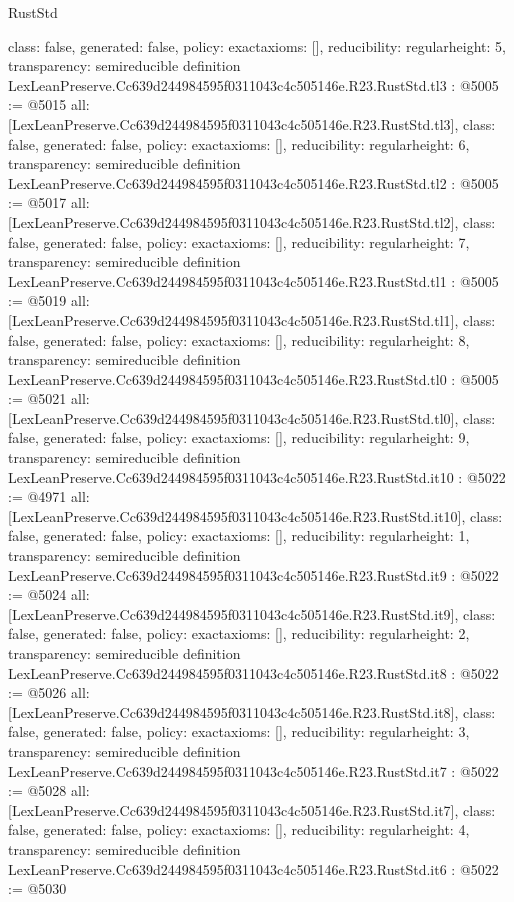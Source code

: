 \begin{lexlean}{RustStd}
\begin{coremodule}
{  class: false,
  generated: false,
  policy: exact{axioms: []},
  reducibility: regular{height: 5},
  transparency: semireducible
}
definition LexLeanPreserve.Cc639d244984595f0311043c4c505146e.R23.RustStd.tl3 : @5005 := @5015 {
  all: [LexLeanPreserve.Cc639d244984595f0311043c4c505146e.R23.RustStd.tl3],
  class: false,
  generated: false,
  policy: exact{axioms: []},
  reducibility: regular{height: 6},
  transparency: semireducible
}
definition LexLeanPreserve.Cc639d244984595f0311043c4c505146e.R23.RustStd.tl2 : @5005 := @5017 {
  all: [LexLeanPreserve.Cc639d244984595f0311043c4c505146e.R23.RustStd.tl2],
  class: false,
  generated: false,
  policy: exact{axioms: []},
  reducibility: regular{height: 7},
  transparency: semireducible
}
definition LexLeanPreserve.Cc639d244984595f0311043c4c505146e.R23.RustStd.tl1 : @5005 := @5019 {
  all: [LexLeanPreserve.Cc639d244984595f0311043c4c505146e.R23.RustStd.tl1],
  class: false,
  generated: false,
  policy: exact{axioms: []},
  reducibility: regular{height: 8},
  transparency: semireducible
}
definition LexLeanPreserve.Cc639d244984595f0311043c4c505146e.R23.RustStd.tl0 : @5005 := @5021 {
  all: [LexLeanPreserve.Cc639d244984595f0311043c4c505146e.R23.RustStd.tl0],
  class: false,
  generated: false,
  policy: exact{axioms: []},
  reducibility: regular{height: 9},
  transparency: semireducible
}
definition LexLeanPreserve.Cc639d244984595f0311043c4c505146e.R23.RustStd.it10 : @5022 := @4971 {
  all: [LexLeanPreserve.Cc639d244984595f0311043c4c505146e.R23.RustStd.it10],
  class: false,
  generated: false,
  policy: exact{axioms: []},
  reducibility: regular{height: 1},
  transparency: semireducible
}
definition LexLeanPreserve.Cc639d244984595f0311043c4c505146e.R23.RustStd.it9 : @5022 := @5024 {
  all: [LexLeanPreserve.Cc639d244984595f0311043c4c505146e.R23.RustStd.it9],
  class: false,
  generated: false,
  policy: exact{axioms: []},
  reducibility: regular{height: 2},
  transparency: semireducible
}
definition LexLeanPreserve.Cc639d244984595f0311043c4c505146e.R23.RustStd.it8 : @5022 := @5026 {
  all: [LexLeanPreserve.Cc639d244984595f0311043c4c505146e.R23.RustStd.it8],
  class: false,
  generated: false,
  policy: exact{axioms: []},
  reducibility: regular{height: 3},
  transparency: semireducible
}
definition LexLeanPreserve.Cc639d244984595f0311043c4c505146e.R23.RustStd.it7 : @5022 := @5028 {
  all: [LexLeanPreserve.Cc639d244984595f0311043c4c505146e.R23.RustStd.it7],
  class: false,
  generated: false,
  policy: exact{axioms: []},
  reducibility: regular{height: 4},
  transparency: semireducible
}
definition LexLeanPreserve.Cc639d244984595f0311043c4c505146e.R23.RustStd.it6 : @5022 := @5030 {
}
\end{coremodule}
\end{lexlean}
